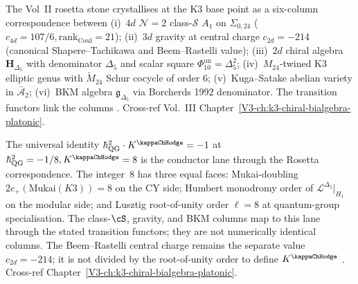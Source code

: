 \begin{remark}
\label{rem:rs-1}
The Vol~II rosetta stone crystallises at the K3 base point as
a six-column correspondence between
(i)~$4d$ $\mathcal N=2$ class-$\mathcal S$ $A_1$ on $\Sigma_{0,24}$
($c_{4d}=107/6, \mathrm{rank}_{\mathrm{Coul}}=21$);
(ii)~$3d$ gravity at central charge $c_{2d}=-214$
(canonical Shapere--Tachikawa and Beem--Rastelli value);
(iii)~$2d$ chiral algebra $\mathbf H_{\Delta_5}$ with denominator
$\Delta_5$ and scalar square $\Phi_{10}^{\mathrm{un}}=\Delta_5^2$;
(iv)~$M_{24}$-twined K3 elliptic genus with $\widetilde M_{24}$ Schur
cocycle of order $6$;
(v)~Kuga--Satake abelian variety in $\bar{\mathcal A}_2$;
(vi)~BKM algebra $\mathfrak g_{\Delta_5}$ via Borcherds 1992 denominator.
The transition functors link the
columns \cite{Gaiotto2009,Borcherds1992,ChengDuncanHarvey2014}.
Cross-ref Vol.~III Chapter~\ref{V3-ch:k3-chiral-bialgebra-platonic}.
\end{remark}

\begin{remark}
\label{rem:rs-2}
The universal identity $\hbar_{\mathrm{QG}}^2\cdot K^{\kappaChHodge} = -1$ at
$\hbar_{\mathrm{QG}}^2 = -1/8, K^{\kappaChHodge} = 8$ is the
conductor lane through the Rosetta correspondence. The integer~$8$
has three equal faces: Mukai-doubling
$2c_+(\mathrm{Mukai}(K3)) = 8$ on the CY side; Humbert monodromy
order of $\mathcal L^{\Delta_5}|_{H_1}$ on the modular side; and
Lusztig root-of-unity order $\ell = 8$ at quantum-group
specialisation. The class-$\cS$, gravity, and BKM columns map to this
lane through the stated transition functors; they are not numerically
identical columns. The Beem--Rastelli central charge remains the
separate value $c_{2d}=-214$; it is not divided by the root-of-unity
order to define $K^{\kappaChHodge}$
\cite{Mukai1987,Lusztig1990,Bruinier2002}. Cross-ref
Chapter~\ref{V3-ch:k3-chiral-bialgebra-platonic}.
\end{remark}

